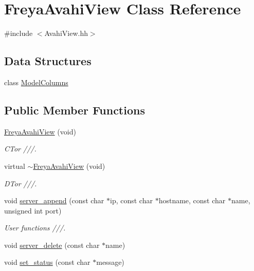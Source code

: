 \hypertarget{classFreyaAvahiView}{
\section{\-Freya\-Avahi\-View \-Class \-Reference}
\label{classFreyaAvahiView}
}


{\ttfamily \#include $<$\-Avahi\-View.\-hh$>$}

\subsection*{\-Data \-Structures}
\begin{DoxyCompactItemize}
\item 
class \hyperlink{classFreyaAvahiView_1_1ModelColumns}{\-Model\-Columns}
\end{DoxyCompactItemize}
\subsection*{\-Public \-Member \-Functions}
\begin{DoxyCompactItemize}
\item 
\hyperlink{classFreyaAvahiView_a7eb789d9d2dea481cf1dcccfe1f9d815}{\-Freya\-Avahi\-View} (void)
\begin{DoxyCompactList}\small\item\em \-C\-Tor ///. \end{DoxyCompactList}\item 
virtual \hyperlink{classFreyaAvahiView_af29f8465096bb3927445c80fd4ea9ec1}{$\sim$\-Freya\-Avahi\-View} (void)
\begin{DoxyCompactList}\small\item\em \-D\-Tor ///. \end{DoxyCompactList}\item 
void \hyperlink{classFreyaAvahiView_a7296757df9bd41a86407b83c17f9f3bf}{server\-\_\-append} (const char $\ast$ip, const char $\ast$hostname, const char $\ast$name, unsigned int port)
\begin{DoxyCompactList}\small\item\em \-User functions ///. \end{DoxyCompactList}\item 
void \hyperlink{classFreyaAvahiView_acf9db4960f3f7ee7fe8c72214fe7b488}{server\-\_\-delete} (const char $\ast$name)
\item 
void \hyperlink{classFreyaAvahiView_a1d4b0d23701e0c4500fd4eed311e83c7}{set\-\_\-status} (const char $\ast$message)
\end{DoxyCompactItemize}
